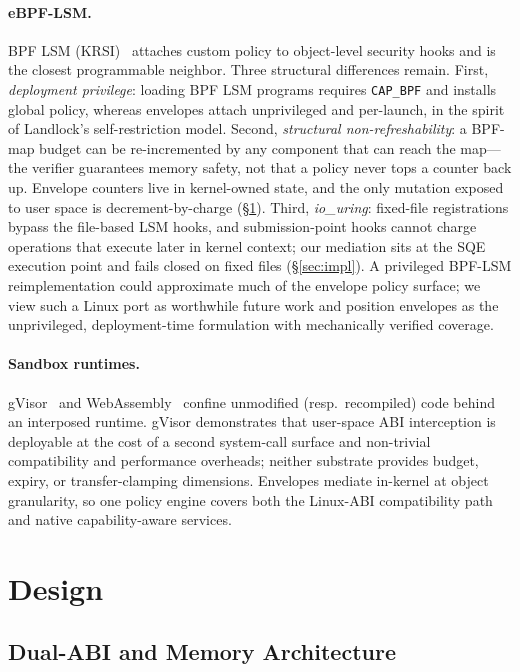 \documentclass[letterpaper,twocolumn,10pt]{article}
\begin{document}
\paragraph{eBPF-LSM.}
BPF LSM (KRSI)~\cite{krsi2019} attaches custom policy to object-level
security hooks and is the closest programmable neighbor.  Three
structural differences remain.  First, \emph{deployment privilege}:
loading BPF LSM programs requires \texttt{CAP\_BPF} and installs global
policy, whereas envelopes attach unprivileged and per-launch, in the
spirit of Landlock's self-restriction model.  Second,
\emph{structural non-refreshability}: a BPF-map budget can be
re-incremented by any component that can reach the map---the verifier
guarantees memory safety, not that a policy never tops a counter back
up.  Envelope counters live in kernel-owned state, and the only
mutation exposed to user space is decrement-by-charge
(\S\ref{sec:design}).  Third, \emph{io\_uring}: fixed-file
registrations bypass the file-based LSM hooks, and submission-point
hooks cannot charge operations that execute later in kernel context;
our mediation sits at the SQE execution point and fails closed on
fixed files (\S\ref{sec:impl}).  A privileged BPF-LSM reimplementation
could approximate much of the envelope policy surface; we view such a
Linux port as worthwhile future work and position envelopes as the
unprivileged, deployment-time formulation with mechanically verified
coverage.

\paragraph{Sandbox runtimes.}
gVisor~\cite{gvisor2019} and WebAssembly~\cite{haas2017wasm} confine
unmodified (resp.~recompiled) code behind an interposed runtime.
gVisor demonstrates that user-space ABI interception is deployable at
the cost of a second system-call surface and non-trivial compatibility
and performance overheads; neither substrate provides budget, expiry,
or transfer-clamping dimensions.  Envelopes mediate in-kernel at
object granularity, so one policy engine covers both the Linux-ABI
compatibility path and native capability-aware services.

\section{Design}
\label{sec:design}

\subsection{Dual-ABI and Memory Architecture}
\end{document}
